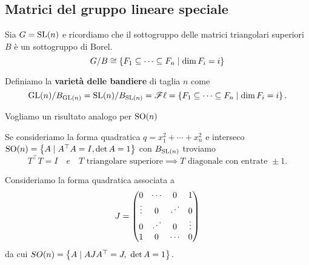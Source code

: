 \subsection{Matrici del gruppo lineare speciale}

Sia $G=\mathrm{SL}(n)$ e ricordiamo che il sottogruppo delle matrici triangolari superiori $B$ \`e un sottogruppo di Borel.
\[G/B\cong\left\{{F_1\subseteq\cdots\subseteq F_n\mid \dim F_i=i}\right\}\]

\begin{definition}
Definiamo la \textbf{variet\`a delle bandiere} di taglia $n$ come
\[\mathrm{GL}(n)/B_{\mathrm{GL}(n)}=\mathrm{SL}(n)/B_{\mathrm{SL}(n)}=\mathscr{F}\ell=\left\{{F_1\subseteq\cdots\subseteq F_n\mid \dim F_i=i}\right\}.\]
\end{definition}

Vogliamo un risultato analogo per $\operatorname{SO}(n)$
\begin{remark}
Se consideriamo la forma quadratica $q=x_1^2+\cdots+x_n^2$ e interseco $\operatorname{SO}(n)=\left\{{A\mid A^\top A=I,\det A=1}\right\}$ con $B_{\mathrm{SL}(n)}$ troviamo
\[T^\top T=I\quad e \quad T\text{ triangolare superiore}\implies T\text{ diagonale con entrate }\pm1.\]
\end{remark}


Consideriamo la forma quadratica associata a
\[J=\begin{pmatrix}
0&\cdots&0&1\\
\vdots&0&\iddots&0\\
0 &\iddots& 0&\vdots\\
1&0&\cdots&0
\end{pmatrix}\]
da cui $SO(n)=\left\{{A\mid AJ A^\top=J,\ \det A=1}\right\}$. 

